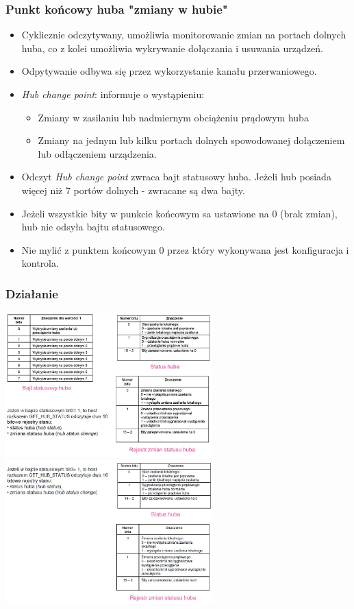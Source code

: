 	\subsubsection{Punkt końcowy huba "zmiany w hubie"}
	\begin{itemize}
		\item Cyklicznie odczytywany, umożliwia monitorowanie zmian na portach dolnych huba, co z kolei umożliwia wykrywanie dołączania i usuwania urządzeń.
		\item Odpytywanie odbywa się przez wykorzystanie kanału przerwaniowego.
		\item \emph{Hub change point}: informuje o wystąpieniu:
		\begin{itemize}
			\item Zmiany w zasilaniu lub nadmiernym obciążeniu prądowym huba
			\item Zmiany na jednym lub kilku portach dolnych spowodowanej dołączeniem lub odłączeniem urządzenia.
		\end{itemize}
		\item Odczyt \emph{Hub change point} zwraca bajt statusowy huba. Jeżeli hub posiada więcej niż 7 portów dolnych - zwracane są dwa bajty.
		\item Jeżeli wszystkie bity w punkcie końcowym sa ustawione na 0 (brak zmian), hub nie odsyła bajtu statusowego.
		\item Nie mylić z punktem końcowym 0 przez który wykonywana jest konfiguracja i kontrola.
	\end{itemize}
	\subsubsection{Działanie}
	\includegraphics[width=8cm]{./wyklady/USB_35_1.jpg}
	\includegraphics[width=8cm]{./wyklady/USB_36_1.jpg}
	
